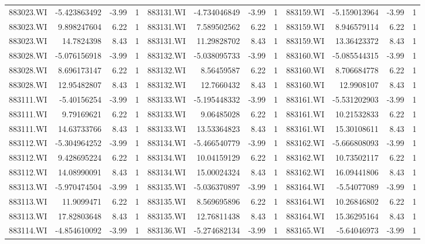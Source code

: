 \documentclass{sysuthesis}
\begin{document}
\begin{table}[htbp]
{\begin{tabular}{rrrrrrrrrrrr}
    883023.WI & -5.423863492 & -3.99 & 1     & 883131.WI & -4.734046849 & -3.99 & 1     & 883159.WI & -5.159013964 & -3.99 & 1 \\
    883023.WI & 9.898247604 & 6.22  & 1     & 883131.WI & 7.589502562 & 6.22  & 1     & 883159.WI & 8.946579114 & 6.22  & 1 \\
    883023.WI & 14.7824398 & 8.43  & 1     & 883131.WI & 11.29828702 & 8.43  & 1     & 883159.WI & 13.36423372 & 8.43  & 1 \\
    883028.WI & -5.076156918 & -3.99 & 1     & 883132.WI & -5.038095733 & -3.99 & 1     & 883160.WI & -5.085544315 & -3.99 & 1 \\
    883028.WI & 8.696173147 & 6.22  & 1     & 883132.WI & 8.56459587 & 6.22  & 1     & 883160.WI & 8.706684778 & 6.22  & 1 \\
    883028.WI & 12.95482807 & 8.43  & 1     & 883132.WI & 12.7660432 & 8.43  & 1     & 883160.WI & 12.9908107 & 8.43  & 1 \\
    883111.WI & -5.40156254 & -3.99 & 1     & 883133.WI & -5.195448332 & -3.99 & 1     & 883161.WI & -5.531202903 & -3.99 & 1 \\
    883111.WI & 9.79169621 & 6.22  & 1     & 883133.WI & 9.06485028 & 6.22  & 1     & 883161.WI & 10.21532833 & 6.22  & 1 \\
    883111.WI & 14.63733766 & 8.43  & 1     & 883133.WI & 13.53364823 & 8.43  & 1     & 883161.WI & 15.30108611 & 8.43  & 1 \\
    883112.WI & -5.304964252 & -3.99 & 1     & 883134.WI & -5.466540779 & -3.99 & 1     & 883162.WI & -5.666808093 & -3.99 & 1 \\
    883112.WI & 9.428695224 & 6.22  & 1     & 883134.WI & 10.04159129 & 6.22  & 1     & 883162.WI & 10.73502117 & 6.22  & 1 \\
    883112.WI & 14.08990091 & 8.43  & 1     & 883134.WI & 15.00024324 & 8.43  & 1     & 883162.WI & 16.09441806 & 8.43  & 1 \\
    883113.WI & -5.970474504 & -3.99 & 1     & 883135.WI & -5.036370897 & -3.99 & 1     & 883164.WI & -5.54077089 & -3.99 & 1 \\
    883113.WI & 11.9099471 & 6.22  & 1     & 883135.WI & 8.569695896 & 6.22  & 1     & 883164.WI & 10.26846802 & 6.22  & 1 \\
    883113.WI & 17.82803648 & 8.43  & 1     & 883135.WI & 12.76811438 & 8.43  & 1     & 883164.WI & 15.36295164 & 8.43  & 1 \\
    883114.WI & -4.854610092 & -3.99 & 1     & 883136.WI & -5.274682134 & -3.99 & 1     & 883165.WI & -5.64046973 & -3.99 & 1 \\

\end{tabular}}
\end{table}
\end{document}

